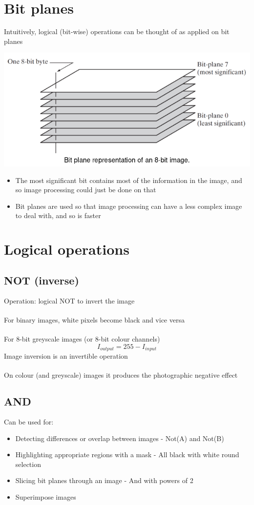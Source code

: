 \documentclass{article}[18pt]
\begin{document}
\section{Bit planes}
Intuitively, logical (bit-wise) operations can be thought of as applied on bit planes
\begin{center}
	\includegraphics[scale=0.7]{bit_planes}
\end{center}
\begin{itemize}
	\item The most significant bit contains most of the information in the image, and so image processing could just be done on that
	\item Bit planes are used so that image processing can have a less complex image to deal with, and so is faster
\end{itemize}
\section{Logical operations}
\subsection{NOT (inverse)}
Operation: logical NOT to invert the image\\
\\
For binary images, white pixels become black and vice versa\\
\\
For 8-bit greyscale images (or 8-bit colour channels)
$$I_{output}=255-I_{input}$$
Image inversion is an invertible operation\\
\\
On colour (and greyscale) images it produces the photographic negative effect
\subsection{AND}
Can be used for:
\begin{itemize}
	\item Detecting differences or overlap between images - Not(A) and Not(B)
	\item Highlighting appropriate regions with a mask - All black with white round selection
	\item Slicing bit planes through an image  - And with powers of 2
	\item Superimpose images
\end{itemize}
\end{document}
